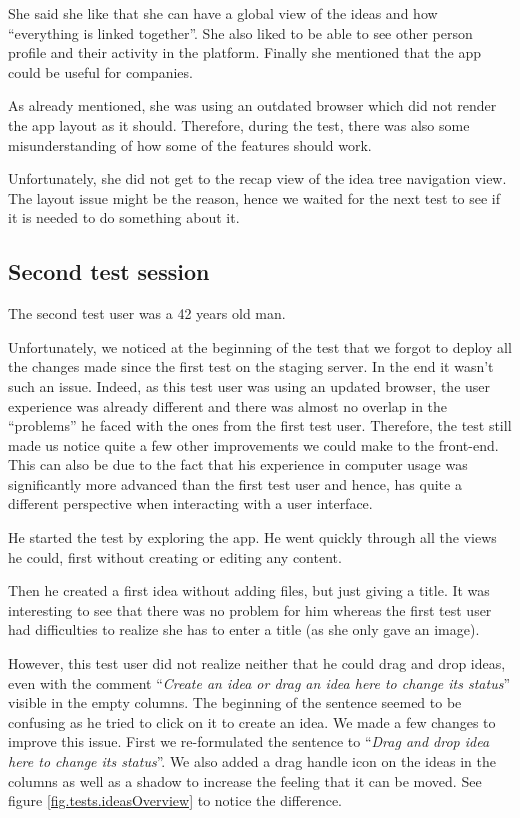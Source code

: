 \documentclass[a4paper,12pt, oneside]{article}
\begin{document}
She said she like that she can have a global view of the ideas and how “everything is linked together”.
She also liked to be able to see other person profile and their activity in the platform.
Finally she mentioned that the app could be useful for companies.

As already mentioned, she was using an outdated browser which did not render the app layout as it should.
Therefore, during the test, there was also some misunderstanding of how some of the features should work.

Unfortunately, she did not get to the recap view of the idea tree navigation view.
The layout issue might be the reason, hence we waited for the next test to see if it is needed to do something about it.

\subsection{Second test session}
The second test user was a 42 years old man.

Unfortunately, we noticed at the beginning of the test that we forgot to deploy all the changes made since the first test on the staging server.
In the end it wasn't such an issue.
Indeed, as this test user was using an updated browser, the user experience was already different and there was almost no overlap in the “problems” he faced with the ones from the first test user.
Therefore, the test still made us notice quite a few other improvements we could make to the front-end.
This can also be due to the fact that his experience in computer usage was significantly more advanced than the first test user and hence, has quite a different perspective when interacting with a user interface.

He started the test by exploring the app.
He went quickly through all the views he could, first without creating or editing any content.

Then he created a first idea without adding files, but just giving a title.
It was interesting to see that there was no problem for him whereas the first test user had difficulties to realize she has to enter a title (as she only gave an image).

However, this test user did not realize neither that he could drag and drop ideas, even with the comment “\emph{Create an idea or drag an idea here to change its status}” visible in the empty columns.
The beginning of the sentence seemed to be confusing as he tried to click on it to create an idea.
We made a few changes to improve this issue.
First we re-formulated the sentence to “\emph{Drag and drop idea here to change its status}”.
We also added a drag handle icon on the ideas in the columns as well as a shadow to increase the feeling that it can be moved.
See figure \ref{fig.tests.ideasOverview} to notice the difference.
\end{document}
